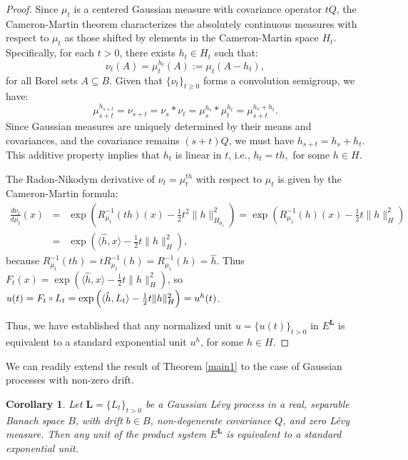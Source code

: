 \documentclass[11pt]{amsart}
\newtheorem{corollary}[theorem]{Corollary}
\theoremstyle{definition}
\theoremstyle{remark}
\numberwithin{equation}{section}
\newcommand{\compcent}[1]{\vcenter{\hbox{$#1\circ$}}}
\newcommand{\comp}{\mathbin{\mathchoice
{\compcent\scriptstyle}{\compcent\scriptstyle}
{\compcent\scriptscriptstyle}{\compcent\scriptscriptstyle}}}
\begin{document}
\begin{proof}
Since \( \mu_t \) is a centered Gaussian measure with covariance operator \( tQ \), the Cameron-Martin theorem characterizes the absolutely continuous measures with respect to \( \mu_t \) as those shifted by elements in the Cameron-Martin space \( H_t \). Specifically, for each \( t > 0 \), there exists \( h_t \in H_t \) such that:
\[
\nu_t(A) =\mu_t^{h_t}(A):= \mu_t(A - h_t),
\]
for all Borel sets \( A \subseteq B \). Given that \( \{ \nu_t \}_{t\geq 0} \) forms a convolution semigroup, we have:
\[
 \mu_{s + t}^{h_{s + t}}=\nu_{s + t} = \nu_s * \nu_t = \mu_s^{h_s} * \mu_t^{h_t} = \mu_{s + t}^{h_s + h_t}.
\]
Since Gaussian measures are uniquely determined by their means and covariances, and the covariance remains \( (s + t)Q \), we must have \(
h_{s + t} = h_s + h_t.
\)
This additive property implies that \( h_t \) is linear in \( t \), i.e., 
\(
h_t = t h,\) for some  \(h\in H.
\)

The Radon-Nikodym derivative of \( \nu_t = \mu_t^{t h} \) with respect to \( \mu_t \) is given by the Cameron-Martin formula:
\begin{eqnarray*}
\frac{d\nu_t}{d\mu_t}(x) &=& \exp\left( R_{\mu_t}^{-1}(th)(x) - \tfrac{1}{2} t^2 \| h \|_{H_{\mu_t}}^2 \right)=\exp\left(  R_{\mu_1}^{-1}(h)(x) - \tfrac{1}{2} t \| h \|_{H}^2 \right)\\&=&\exp\left( \langle \hat{h}, x\rangle - \tfrac{1}{2} t \| h \|_{H}^2 \right),
\end{eqnarray*} because \(R_{\mu_t}^{-1}(th)=tR_{\mu_t}^{-1}(h)=R_{\mu_1}^{-1}(h)=\hat{h}\). Thus \(
F_t(x) =\exp\left( \langle \hat{h}, x\rangle - \tfrac{1}{2} t \| h \|_{H}^2 \right)
\), so \( u(t) = F_t\comp L_t=\exp\left( \langle \hat{h}, L_t\rangle - \tfrac{1}{2} t \| h \|_{H}^2 \right)=u^h(t)\).

Thus, we have established that any normalized unit \( u = \{u(t)\}_{t > 0} \) in \( E^{\bm{L}} \) is equivalent to a standard exponential unit \( u^{h} \), for some \( h \in H \).
\end{proof}

We can readily extend the result of Theorem \ref{main1} to the case of Gaussian processes with non-zero drift.

\begin{corollary}\label{cor:extension}
Let \( \bm{L} = \{L_t\}_{t > 0} \) be a Gaussian L\'evy process in a real, separable Banach space \( B \), with drift \( b \in B \), non-degenerate covariance \( Q \), and zero L\'evy measure. Then any unit of the product system \( E^{\bm{L}} \) is equivalent to a standard exponential unit. 
\end{corollary}
\end{document}
